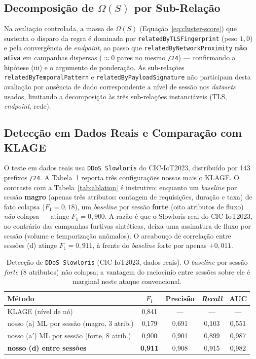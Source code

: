 \documentclass[preprint,12pt]{elsarticle}
\begin{document}
\subsection{Decomposição de $\Omega(S)$ por Sub-Relação}

Na avaliação controlada, a massa de $\Omega(S)$ (Equação~\ref{eq:cluster-score}) que sustenta o disparo da regra é dominada por \texttt{relatedByTLSFingerprint} (peso $1{,}0$) e pela convergência de \emph{endpoint}, ao passo que \texttt{relatedByNetworkProximity} \textbf{não ativa} em campanhas dispersas ($\approx 0$ pares no mesmo \texttt{/24}) --- confirmando a hipótese (iii) e o argumento de ponderação. As sub-relações \texttt{relatedByTemporalPattern} e \texttt{relatedByPayloadSignature} não participam desta avaliação por ausência de dado correspondente a nível de sessão nos \emph{datasets} usados, limitando a decomposição às três sub-relações instanciáveis (TLS, \emph{endpoint}, rede).

\subsection{Detecção em Dados Reais e Comparação com KLAGE}
\label{sec:real}

O teste em dados reais usa \texttt{DDoS Slowloris} do CIC-IoT2023, distribuído por 143 prefixos \texttt{/24}. A Tabela~\ref{tab:real} reporta três configurações nossas mais o KLAGE. O contraste com a Tabela~\ref{tab:ablation} é instrutivo: enquanto um \emph{baseline} por sessão \textbf{magro} (apenas três atributos: contagem de requisições, duração e taxa) de fato colapsa ($F_1 = 0{,}18$), um \emph{baseline} por sessão \textbf{forte} (oito atributos de fluxo) \emph{não} colapsa --- atinge $F_1 = 0{,}900$. A razão é que o Slowloris real do CIC-IoT2023, ao contrário das campanhas furtivas sintéticas, deixa uma assinatura de fluxo por sessão (volume e temporização anômalos). O arcabouço de correlação entre sessões (d) atinge $F_1 = 0{,}911$, à frente do \emph{baseline} forte por apenas $+0{,}011$.

\begin{table}[ht]
\centering
\caption{Detecção de \texttt{DDoS Slowloris} (CIC-IoT2023, dados reais). O \emph{baseline} por sessão \emph{forte} (8 atributos) não colapsa; a vantagem do raciocínio entre sessões sobre ele é marginal neste ataque convencional.}
\label{tab:real}
\begin{tabular}{lcccc}
\toprule
Método & $F_1$ & Precisão & \emph{Recall} & AUC \\
\midrule
KLAGE (nível de nó)~\cite{belcastro2025klage} & 0,841 & --- & --- & --- \\
nosso (a) ML por sessão (magro, 3 atrib.) & 0,179 & 0,691 & 0,103 & 0,551 \\
nosso (a$'$) ML por sessão (forte, 8 atrib.) & 0,900 & 0,901 & 0,899 & 0,987 \\
\textbf{nosso (d) entre sessões} & \textbf{0,911} & 0,908 & 0,915 & 0,982 \\
\bottomrule
\end{tabular}
\end{table}
\end{document}
